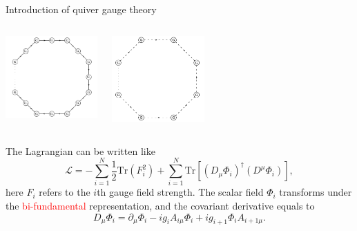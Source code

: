 \documentclass{beamer}
\begin{document}
\begin{frame}{Introduction of quiver gauge theory}
\vspace{1em}
\begin{columns}[c]
    \centering
    \includegraphics[width=100pt]{Moose.png}

    \centering

    \centering
    \includegraphics[width=100pt]{Moosed.jpeg}
\end{columns}


\pause
\raggedright
The Lagrangian can be written like
\begin{equation*}
    \mathcal{L} = -\sum_{i=1}^{N} \frac{1}{2} \mathrm{Tr}(F_i^2)
    + \sum_{i=1}^{N} \mathrm{Tr}\left[(D_\mu \Phi_i)^\dagger (D^\mu \Phi_i)\right],
\end{equation*}
here $F_i$ refers to the $i$th gauge field strength. The scalar field $\Phi_i$ transforms under the \textcolor{red}{bi-fundamental} representation, and the covariant derivative equals to
\begin{equation*}
    D_\mu \Phi_i = \partial_\mu \Phi_i - i g_i A_{i\mu} \Phi_i + i g_{i+1} \Phi_i A_{i+1\mu}.
\end{equation*}

\end{frame}
\end{document}
